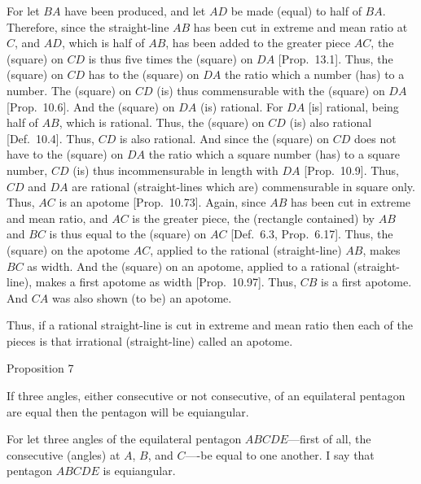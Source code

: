 For let $BA$ have been produced, and let $AD$ be made (equal) to
half of $BA$. Therefore, since the straight-line $AB$ has been cut in
extreme and mean ratio at $C$, and $AD$, which is half of $AB$, has been added to the greater piece $AC$, the (square) on $CD$ is thus 
five times the (square) on $DA$ [Prop.~13.1]. Thus, the (square) on $CD$
has to the (square) on $DA$ the ratio which a number (has) to a number.
The (square) on $CD$ (is) thus commensurable with the (square) on
$DA$ [Prop.~10.6]. And the (square) on $DA$ (is) rational.
For $DA$ [is] rational, being half of $AB$, which is rational.
Thus, the (square) on $CD$ (is) also rational [Def.~10.4]. 
Thus, $CD$ is also rational. And since the (square) on $CD$ does not have to
the (square) on $DA$ the ratio which a square number (has) to a square
number, $CD$ (is) thus incommensurable in length with $DA$ [Prop.~10.9].
Thus, $CD$  and $DA$ are rational (straight-lines which are) commensurable in square only. Thus, $AC$ is an apotome [Prop.~10.73].  Again, since
$AB$ has been cut in extreme and mean ratio, and $AC$ is the greater
piece, the (rectangle contained) by $AB$ and $BC$ is thus equal
to the (square) on $AC$ [Def.~6.3, Prop.~6.17]. Thus, the (square) on
the apotome $AC$, applied to the rational (straight-line) $AB$, makes $BC$
as width. And the (square) on an apotome, applied to a rational
(straight-line), makes a first apotome as width [Prop.~10.97].
Thus, $CB$ is a first apotome. And $CA$ was also
shown (to be) an apotome.

Thus, if a rational straight-line is cut in extreme and mean ratio then each of
the pieces is that irrational (straight-line) called an apotome.


\begin{center}
{\large Proposition 7}
\end{center}

If  three angles, either  consecutive or not consecutive, of an equilateral pentagon
are equal then the pentagon will be equiangular.

\centerline{}

For let three angles of the equilateral pentagon $ABCDE$---first of
all, the consecutive (angles) at $A$, $B$, and $C$----be equal to
one another. I say that pentagon $ABCDE$ is equiangular.

